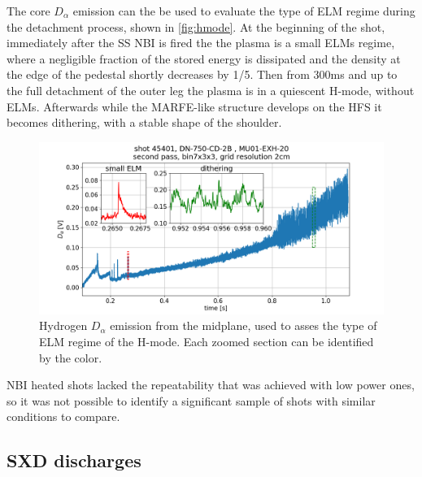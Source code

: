 The core $D_{\alpha}$ emission can the be used to evaluate the type of ELM regime during the detachment process, shown in \autoref{fig:hmode}. At the beginning of the shot, immediately after the SS NBI is fired the the plasma is a small ELMs regime, where a negligible fraction of the stored energy is dissipated and the density at the edge of the pedestal shortly decreases by 1/5. Then from 300ms and up to the full detachment of the outer leg the plasma is in a quiescent H-mode, without ELMs. Afterwards while the MARFE-like structure develops on the HFS it becomes dithering, with a stable shape of the shoulder.


\begin{figure}
	\centering
	\includegraphics[trim={40 0 80 50},clip,width=0.9\linewidth]{Chapters/chapter2/figs/IRVB-MASTU_shot-45401_pass1_bin7x3x3_gridres2cm_all_variables_absolute_small4.png}
	\caption{Hydrogen $D_{\alpha}$ emission from the midplane, used to asses the type of ELM regime of the H-mode. Each zoomed section can be identified by the color.}
	\label{fig:hmode}
\end{figure}

NBI heated shots lacked the repeatability that was achieved with low power ones, so it was not possible to identify a significant sample of shots with similar conditions to compare.


\subsection{SXD discharges}\label{SXD discharges}

